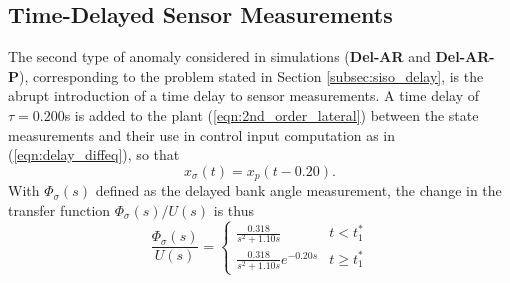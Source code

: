\subsection{Time-Delayed Sensor Measurements}\label{subsec:siso_delay_sims}
The second type of anomaly considered in simulations (\textbf{Del-AR} and \textbf{Del-AR-P}), corresponding to the problem stated in Section \ref{subsec:siso_delay}, is the abrupt introduction of a time delay to sensor measurements. A time delay of $\tau = 0.200$s is added to the plant (\ref{eqn:2nd_order_lateral}) between the state measurements and their use in control input computation as in (\ref{eqn:delay_diffeq}), so that
\begin{equation}
	x_\sigma(t) = x_p(t - 0.20).
\end{equation}
With $\Phi_\sigma(s)$ defined as the delayed bank angle measurement, the change in the transfer function $\Phi_\sigma(s)/U(s)$ is thus
\begin{equation}
		\frac{\Phi_\sigma(s)}{U(s)} = \begin{cases}
			\frac{0.318}{s^2 + 1.10s} & t < t_1^*\\
			\frac{0.318}{s^2 + 1.10s}e^{-0.20 s} & t \geq t_1^*
		\end{cases} 
\end{equation}

